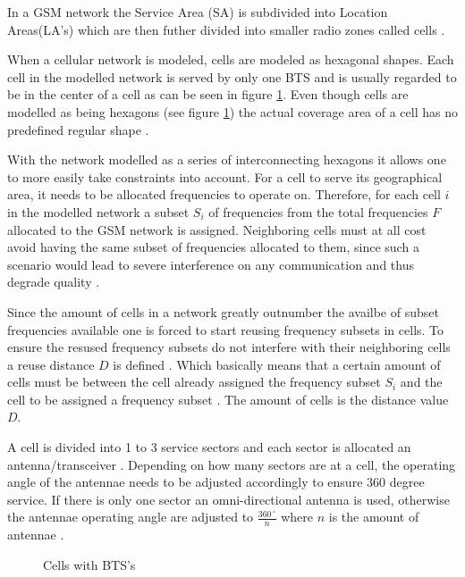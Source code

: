 In a GSM network the Service Area (SA) is subdivided into Location Areas(LA's) which are then futher divided into smaller radio zones called cells \cite{GSMSecurInTeleNetwork}. 

When a cellular network is modeled, cells are modeled as hexagonal shapes. Each cell in the modelled network is served by only one BTS and is usually regarded to be in the center of a cell as can be seen in figure \ref{fig:GSMCell}\cite{GSMArchitectureProtocolsServices}. Even though cells are modelled as being hexagons (see figure \ref{fig:GSMCell}) the actual coverage area of a cell has no predefined regular shape \cite{GSMArchitectureProtocolsServices}.

With the network modelled as a series of interconnecting hexagons it allows one to more easily take constraints into account. For a cell to serve its geographical area, it needs to be allocated frequencies to operate on. Therefore, for each cell $i$ in the modelled network a subset $S_i$ of frequencies from the total frequencies $F$ allocated to the GSM network is assigned\cite{GSMArchitectureProtocolsServices}. Neighboring cells must at all cost avoid having the same subset of frequencies allocated to them, since such a scenario would lead to severe interference on any communication and thus degrade quality \cite{GSMArchitectureProtocolsServices}.

Since the amount of cells in a network greatly outnumber the availbe of subset frequencies available one is forced to start reusing frequency subsets in cells. To ensure the resused frequency subsets do not interfere with their neighboring cells a reuse distance $D$ is defined \cite{GSMArchitectureProtocolsServices}. Which basically means that a certain amount of cells must be between the cell already assigned the frequency subset $S_i$ and the cell to be assigned a frequency subset \cite{GSMArchitectureProtocolsServices}. The amount of cells is the distance value $D$.

A cell is divided into 1 to 3 service sectors and each sector is allocated an antenna/transceiver \cite{GSMSysEngin}. Depending on how many sectors are at a cell, the operating angle of the antennae needs to be adjusted accordingly to ensure 360 degree service. If there is only one sector an omni-directional antenna is used, otherwise the antennae operating angle are adjusted to $\frac{360\,^{\circ}}{n}$ where ${n}$ is the amount of antennae \cite{Eisenblatter}.
\begin{figure}[h]
	\begin{centering}
		
		\caption{Cells with BTS's}
		\label{fig:GSMCell}
	\end{centering}
\end{figure}

